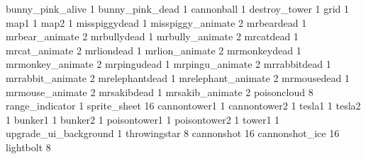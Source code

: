 bunny_pink_alive 1
bunny_pink_dead 1
cannonball 1
destroy_tower 1
grid 1
map1 1
map2 1
misspiggydead 1
misspiggy_animate 2
mrbeardead 1
mrbear_animate 2
mrbullydead 1
mrbully_animate 2
mrcatdead 1
mrcat_animate 2
mrliondead 1
mrlion_animate 2
mrmonkeydead 1
mrmonkey_animate 2
mrpingudead 1
mrpingu_animate 2
mrrabbitdead 1
mrrabbit_animate 2
mrelephantdead 1
mrelephant_animate 2
mrmousedead 1
mrmouse_animate 2
mrsakibdead 1
mrsakib_animate 2
poisoncloud 8
range_indicator 1
sprite_sheet 16
cannontower1 1
cannontower2 1
tesla1 1
tesla2 1
bunker1 1
bunker2 1
poisontower1 1
poisontower2 1
tower1 1
upgrade_ui_background 1
throwingstar 8
cannonshot 16
cannonshot_ice 16
lightbolt 8
